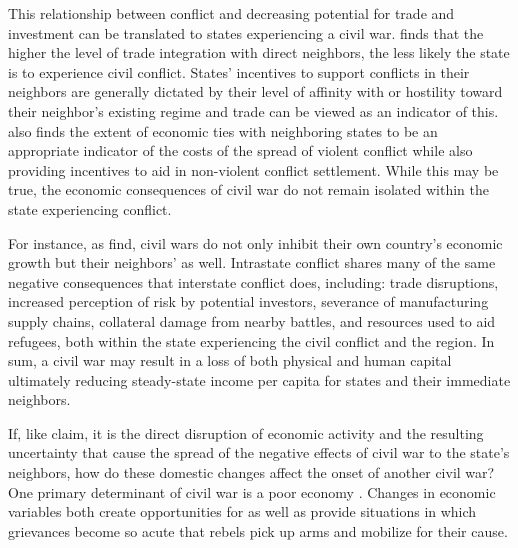 \documentclass[12pt,letterpaper]{article}
\begin{document}
This relationship between conflict and decreasing potential for trade and investment can be translated to states experiencing a civil war. \citet{Gleditsch2007} finds that the higher the level of trade integration with direct neighbors, the less likely the state is to experience civil conflict. States' incentives to support conflicts in their neighbors are generally dictated by their level of affinity with or hostility toward their neighbor's existing regime and trade can be viewed as an indicator of this. \citet{Gleditsch2007} also finds the extent of economic ties with neighboring states to be an appropriate indicator of the costs of the spread of violent conflict while also providing incentives to aid in non-violent conflict settlement. While this may be true, the economic consequences of civil war do not remain isolated within the state experiencing conflict. 

For instance, as \citet{MurdochSandler2002} find, civil wars do not only inhibit their own country's economic growth but their neighbors' as well. Intrastate conflict shares many of the same negative consequences that interstate conflict does, including: trade disruptions, increased perception of risk by potential investors, severance of manufacturing supply chains, collateral damage from nearby battles, and resources used to aid refugees, both within the state experiencing the civil conflict and the region. In sum, a civil war may result in a loss of both physical and human capital ultimately reducing steady-state income per capita for states and their immediate neighbors. 

If, like \citet{MurdochSandler2002} claim, it is the direct disruption of economic activity and the resulting uncertainty that cause the spread of the negative effects of civil war to the state's neighbors, how do these domestic changes affect the onset of another civil war? One primary determinant of civil war is a poor economy \citep{FearonLaitin2003, CollierHoeffler1998, CollierHoeffler2004, MiguelSatyanathSergenti2004}. Changes in economic variables both create opportunities for as well as provide situations in which grievances become so acute that rebels pick up arms and mobilize for their cause. 
\end{document}
